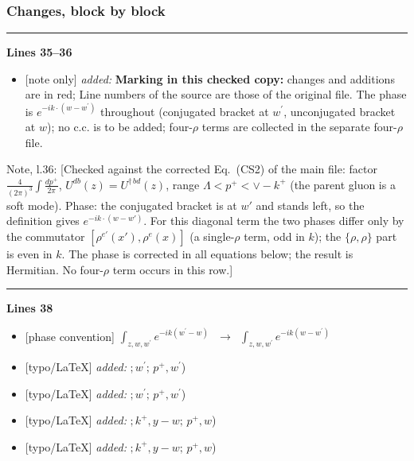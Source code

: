 \documentclass[10pt]{article}
\newenvironment{notebox}{\def\FrameCommand{{\color{notebar}\vrule width 1.5pt}\hspace{6pt}}\MakeFramed{\advance\hsize-\width\FrameRestore}\small}{\endMakeFramed}
\begin{document}
\subsubsection*{Changes, block by block}
\noindent\rule{\linewidth}{0.3pt}\par\noindent\textbf{Lines 35--36}\par
\begin{itemize}[leftmargin=2.2em,itemsep=1pt,topsep=2pt]
\item[\textbf{l.35}] \textsf{\small [note only]} \emph{added:} \textbf{Marking in this checked copy:} changes and additions are in red;  Line numbers of the source are those of the original file. The phase is $e^{-ik\cdot(w-w^{\prime})}$ throughout (conjugated bracket at $w^{\prime}$, unconjugated bracket at $w$); no c.c. is to be added; four-$\rho$ terms are collected in the separate four-$\rho$ file.
\end{itemize}
\begin{notebox}\textsf{\small Note, l.36:} [Checked against the corrected Eq.~(CS2) of the main file: factor $\frac{4}{(2\pi)^{3}}\int\frac{dp^{+}}{2\pi}$, $U^{db}(z)=U^{\dagger\,bd}(z)$, range $\Lambda<p^{+}<\vee-k^{+}$ (the parent gluon is a soft mode). Phase: the conjugated bracket is at $w'$ and stands left, so the definition gives $e^{-ik\cdot(w-w')}$. For this diagonal term the two phases differ only by the commutator $[\rho^{e'}(x'),\rho^{e}(x)]$ (a single-$\rho$ term, odd in $k$); the $\{\rho,\rho\}$ part is even in $k$. The phase is corrected in all equations below; the result is Hermitian. No four-$\rho$ term occurs in this row.]\end{notebox}
\noindent\rule{\linewidth}{0.3pt}\par\noindent\textbf{Lines 38} \par
\begin{itemize}[leftmargin=2.2em,itemsep=1pt,topsep=2pt]
\item[\textbf{l.38}] \textsf{\small [phase convention]} $\displaystyle \int_{z,w,w^{\prime}} e^{-ik(w^{\prime}-w)}\,$\ $\longrightarrow$\ $\displaystyle \int_{z,w,w^{\prime}} e^{-ik(w-w^{\prime})}\,$
\item[\textbf{l.38}] \textsf{\small [typo/LaTeX]} \emph{added:} $\displaystyle ;$$\displaystyle w^{\prime};\, p^{+},w^{\prime}${\color{gray}\small)}
\item[\textbf{l.38}] \textsf{\small [typo/LaTeX]} \emph{added:} $\displaystyle ;$$\displaystyle w^{\prime};\, p^{+},w^{\prime}${\color{gray}\small)}
\item[\textbf{l.38}] \textsf{\small [typo/LaTeX]} \emph{added:} $\displaystyle ;$$\displaystyle k^{+},y-w;\, p^{+},w${\color{gray}\small)}
\item[\textbf{l.38}] \textsf{\small [typo/LaTeX]} \emph{added:} $\displaystyle ;$$\displaystyle k^{+},y-w;\, p^{+},w${\color{gray}\small)}
\end{itemize}
\end{document}
